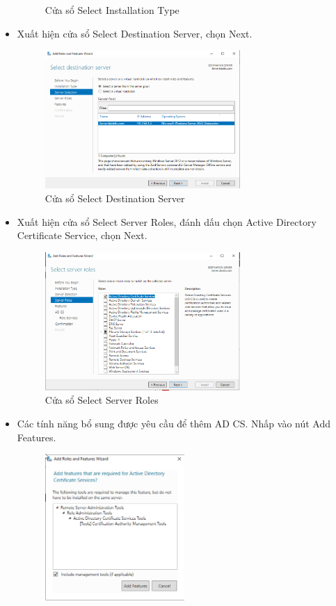 \documentclass[13pt]{report}
\begin{document}
\begin{itemize}
\begin{figure}[htp]
			\caption{Cửa sổ Select Installation Type}
		\end{figure}
		\item Xuất hiện cửa sổ Select Destination Server, chọn Next.
		\begin{figure}[htp]
			\centering
			\includegraphics[width=0.7\textwidth]{image/Gui/ADCS/4.png}
			\caption{Cửa sổ Select Destination Server}
		\end{figure}
		\newpage
		\item Xuất hiện cửa sổ Select Server Roles, đánh dấu chọn Active Directory Certificate Service, chọn Next.	
		\begin{figure}[htp]
			\centering
			\includegraphics[width=0.7\textwidth]{image/Gui/ADCS/6.png}
			\caption{Cửa sổ Select Server Roles}
		\end{figure}
		\item Các tính năng bổ sung được yêu cầu để thêm AD CS. Nhấp vào nút Add Features.
		\begin{figure}[htp]
			\centering
			\includegraphics[width=0.5\textwidth]{image/Gui/ADCS/5.png}

\end{figure}
\end{itemize}
\end{document}
